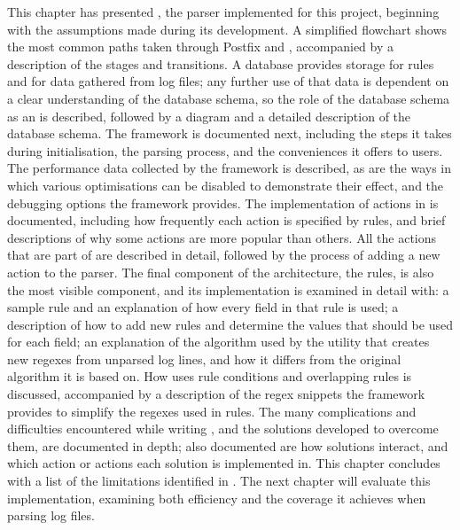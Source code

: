 This chapter has presented \parsername{}, the parser implemented for this
project, beginning with the assumptions made during its development.  A
simplified flowchart shows the most common paths taken through Postfix and
\parsername{}, accompanied by a description of the stages and transitions.
A database provides storage for rules and for data gathered from log files;
any further use of that data is dependent on a clear understanding of the
database schema, so the role of the database schema as an  is
described, followed by a diagram and a detailed description of the database
schema.  The framework is documented next, including the steps it takes
during initialisation, the parsing process, and the conveniences it offers
to users.  The performance data collected by the framework is described, as
are the ways in which various optimisations can be disabled to demonstrate
their effect, and the debugging options the framework provides.  The
implementation of actions in \parsername{} is documented, including how
frequently each action is specified by rules, and brief descriptions of why
some actions are more popular than others.  All the actions that are part
of \parsername{} are described in detail, followed by the process of adding
a new action to the parser.  The final component of the architecture, the
rules, is also the most visible component, and its implementation is
examined in detail with: a sample rule and an explanation of how every
field in that rule is used; a description of how to add new rules and
determine the values that should be used for each field; an explanation of
the algorithm used by the utility that creates new regexes from unparsed
log lines, and how it differs from the original algorithm it is based on.
How \parsername{} uses rule conditions and overlapping rules is discussed,
accompanied by a description of the regex snippets the framework provides
to simplify the regexes used in rules.  The many complications and
difficulties encountered while writing \parsername{}, and the solutions
developed to overcome them, are documented in depth; also documented are
how solutions interact, and which action or actions each solution is
implemented in.  This chapter concludes with a list of the limitations
identified in \parsername{}.  The next chapter will evaluate this
implementation, examining both \parsernames{} efficiency and the coverage
it achieves when parsing log files.
